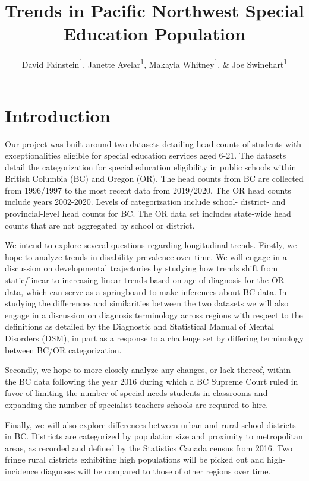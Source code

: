 \documentclass[
  english,
  man]{apa6}
\title{Trends in Pacific Northwest Special Education Population}
\author{David Fainstein\textsuperscript{1}, Janette Avelar\textsuperscript{1}, Makayla Whitney\textsuperscript{1}, \& Joe Swinehart\textsuperscript{1}}
\date{}
\affiliation{\vspace{0.5cm}\textsuperscript{1} University of Oregon}
\begin{document}
\maketitle

\hypertarget{introduction}{%
\section{Introduction}\label{introduction}}

Our project was built around two datasets detailing head counts of students with exceptionalities eligible for special education services aged 6-21. The datasets detail the categorization for special education eligibility in public schools within British Columbia (BC) and Oregon (OR). The head counts from BC are collected from 1996/1997 to the most recent data from 2019/2020. The OR head counts include years 2002-2020. Levels of categorization include school- district- and provincial-level head counts for BC. The OR data set includes state-wide head counts that are not aggregated by school or district.

We intend to explore several questions regarding longitudinal trends. Firstly, we hope to analyze trends in disability prevalence over time. We will engage in a discussion on developmental trajectories by studying how trends shift from static/linear to increasing linear trends based on age of diagnosis for the OR data, which can serve as a springboard to make inferences about BC data. In studying the differences and similarities between the two datasets we will also engage in a discussion on diagnosis terminology across regions with respect to the definitions as detailed by the Diagnostic and Statistical Manual of Mental Disorders (DSM), in part as a response to a challenge set by differing terminology between BC/OR categorization.

Secondly, we hope to more closely analyze any changes, or lack thereof, within the BC data following the year 2016 during which a BC Supreme Court ruled in favor of limiting the number of special needs students in classrooms and expanding the number of specialist teachers schools are required to hire.

Finally, we will also explore differences between urban and rural school districts in BC. Districts are categorized by population size and proximity to metropolitan areas, as recorded and defined by the Statistics Canada census from 2016. Two fringe rural districts exhibiting high populations will be picked out and high-incidence diagnoses will be compared to those of other regions over time.
\end{document}
